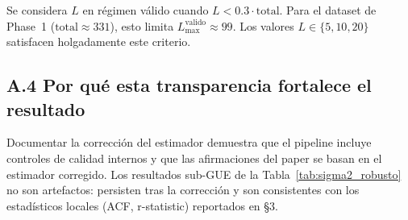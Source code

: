 \documentclass[12pt, a4paper]{article}
\begin{document}
Se considera $L$ en régimen válido cuando $L < 0.3 \cdot \text{total}$.
Para el dataset de Phase~1 ($\text{total} \approx 331$), esto limita
$L_\text{max}^\text{valido} \approx 99$. Los valores $L \in \{5, 10, 20\}$
satisfacen holgadamente este criterio.

\subsection*{A.4 Por qué esta transparencia fortalece el resultado}

Documentar la corrección del estimador demuestra que el pipeline
incluye controles de calidad internos y que las afirmaciones del
paper se basan en el estimador corregido. Los resultados sub-GUE
de la Tabla~\ref{tab:sigma2_robusto} no son artefactos: persisten
tras la corrección y son consistentes con los estadísticos locales
(ACF, r-statistic) reportados en §3.
\end{document}
